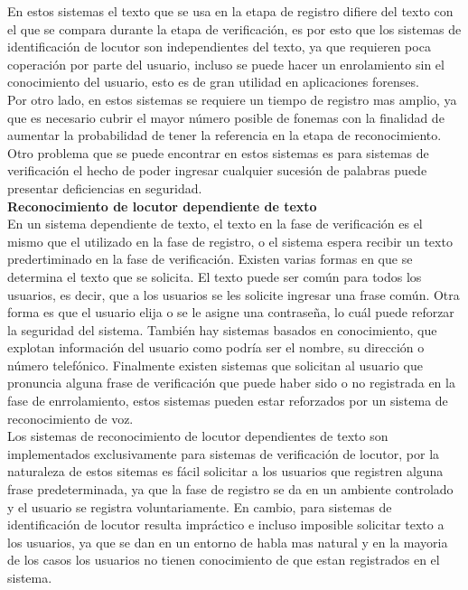En estos sistemas el texto que se usa en la etapa de registro difiere del texto con el que se compara durante la etapa de verificaci\'on, es por esto que los sistemas de identificaci\'on de locutor son independientes del texto, ya que requieren poca coperaci\'on por parte del usuario, incluso se puede hacer un enrolamiento sin el conocimiento del usuario, esto es de gran utilidad en aplicaciones forenses.\\

Por otro lado, en estos sistemas se requiere un tiempo de registro mas amplio, ya que es necesario cubrir el mayor n\'umero posible de fonemas con la finalidad de aumentar la probabilidad de tener la referencia en la etapa de reconocimiento. Otro problema que se puede encontrar en estos sistemas es para sistemas de verificaci\'on el hecho de poder ingresar cualquier sucesi\'on de palabras puede presentar deficiencias en seguridad.\\  

\textbf{\large Reconocimiento de locutor dependiente de texto}\\

En un sistema dependiente de texto, el texto en la fase de verificaci\'on es el mismo que el utilizado en la fase de registro, o el sistema espera recibir un texto predertiminado en la fase de verificaci\'on. Existen varias formas en que se determina el texto que se solicita. El texto puede ser com\'un para todos los usuarios, es decir, que a los usuarios se les solicite ingresar una frase com\'un. Otra forma es que el usuario elija o se le asigne una contraseña, lo cu\'al puede reforzar la seguridad del sistema. Tambi\'en hay sistemas basados en conocimiento, que explotan informaci\'on del usuario como podr\'ia ser el nombre, su direcci\'on o n\'umero telef\'onico. Finalmente existen sistemas que solicitan al usuario que pronuncia alguna frase de verificaci\'on que puede haber sido o no registrada en la fase de enrrolamiento, estos sistemas pueden estar reforzados por un sistema de reconocimiento de voz.\\

Los sistemas de reconocimiento de locutor dependientes de texto son implementados exclusivamente para sistemas de verificaci\'on de locutor, por la naturaleza de estos sitemas es f\'acil solicitar a los usuarios que registren alguna frase predeterminada, ya que la fase de registro se da en un ambiente controlado y el usuario se registra voluntariamente. En cambio, para sistemas de identificaci\'on de locutor resulta impr\'actico e incluso imposible solicitar texto a los usuarios, ya que se dan en un entorno de habla mas natural y en la mayoria de los casos los usuarios no tienen conocimiento de que estan registrados en el sistema.\\ 

